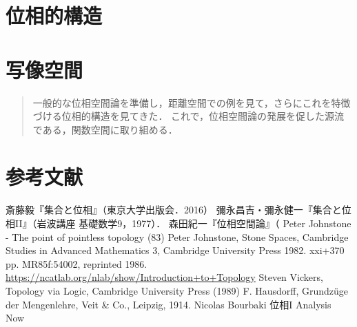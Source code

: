 \documentclass[uplatex,dvipdfmx]{jsreport}
\begin{document}
\chapter{位相的構造}

\chapter{写像空間}

\begin{quotation}
    一般的な位相空間論を準備し，距離空間での例を見て，さらにこれを特徴づける位相的構造を見てきた．
    これで，位相空間論の発展を促した源流である，関数空間に取り組める．
\end{quotation}

\chapter{参考文献}

\begin{thebibliography}{99}
    斎藤毅『集合と位相』（東京大学出版会．2016）
    彌永昌吉・彌永健一『集合と位相II』（岩波講座 基礎数学9，1977）．
    森田紀一『位相空間論』（
        Peter Johnstone - The point of pointless topology (83)
        Peter Johnstone, Stone Spaces, Cambridge Studies in Advanced Mathematics 3, Cambridge University Press 1982. xxi+370 pp. MR85f:54002, reprinted 1986.
        \url{https://ncatlab.org/nlab/show/Introduction+to+Topology}
        Steven Vickers, Topology via Logic, Cambridge University Press (1989)
    F. Hausdorff, Grundzüge der Mengenlehre, Veit \& Co., Leipzig, 1914.
    Nicolas Bourbaki 位相I
    Analysis Now
\end{thebibliography}
\end{document}
